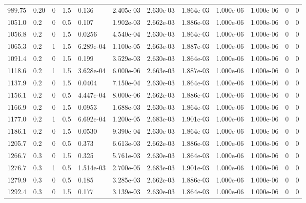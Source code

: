 \documentclass[preview]{standalone}
\begin{document}
{{{\begin{tabular}{L{1.2cm}C{1.2cm} C{0.3cm}C{0.5cm} C{1.4cm}C{1.4cm} C{1.4cm}C{1.4cm} C{1.6cm}C{1.6cm} C{1.6cm}C{1.6cm}}
  989.75  &  0.20  & 0     & 1.5 &  0.136  & 2.405e-03  &  2.630e-03&   1.864e-03& 1.000e-06 & 1.000e-06   &  0 & 0  \\ 
  1051.0  &   0.2  & 0     & 0.5 &  0.107  & 1.902e-03  &  2.662e-03&   1.886e-03& 1.000e-06 & 1.000e-06   &  0 & 0  \\ 
  1056.8  &   0.2  & 0     & 1.5 &  0.0256  & 4.540e-04  &  2.630e-03&   1.864e-03& 1.000e-06 & 1.000e-06   &  0 & 0  \\ 
  1065.3  &   0.2  & 1     & 1.5 &  6.289e-04  & 1.100e-05  &  2.663e-03&   1.887e-03& 1.000e-06 & 1.000e-06   &  0 & 0  \\ 
  1091.4  &   0.2  & 0     & 1.5 &  0.199  & 3.529e-03  &  2.630e-03&   1.864e-03& 1.000e-06 & 1.000e-06   &  0 & 0  \\ 
  1118.6  &   0.2  & 1     & 1.5 &  3.628e-04  & 6.000e-06  &  2.663e-03&   1.887e-03& 1.000e-06 & 1.000e-06   &  0 & 0  \\ 
  1137.9  &   0.2  & 0     & 1.5 &  0.0404  & 7.150e-04  &  2.630e-03&   1.864e-03& 1.000e-06 & 1.000e-06   &  0 & 0  \\ 
  1156.1  &   0.2  & 0     & 0.5 &  4.447e-04  & 8.000e-06  &  2.662e-03&   1.886e-03& 1.000e-06 & 1.000e-06   &  0 & 0  \\ 
  1166.9  &   0.2  & 0     & 1.5 &  0.0953  & 1.688e-03  &  2.630e-03&   1.864e-03& 1.000e-06 & 1.000e-06   &  0 & 0  \\ 
  1177.0  &   0.2  & 1     & 0.5 &  6.692e-04  & 1.200e-05  &  2.683e-03&   1.901e-03& 1.000e-06 & 1.000e-06   &  0 & 0  \\ 
  1186.1  &   0.2  & 0     & 1.5 &  0.0530  & 9.390e-04  &  2.630e-03&   1.864e-03& 1.000e-06 & 1.000e-06   &  0 & 0  \\ 
  1205.7  &   0.2  & 0     & 0.5 &  0.373  & 6.613e-03  &  2.662e-03&   1.886e-03& 1.000e-06 & 1.000e-06   &  0 & 0  \\ 
  1266.7  &   0.3  & 0     & 1.5 &  0.325  & 5.761e-03  &  2.630e-03&   1.864e-03& 1.000e-06 & 1.000e-06   &  0 & 0  \\ 
  1276.7  &   0.3  & 1     & 0.5 &  1.514e-03  & 2.700e-05  &  2.683e-03&   1.901e-03& 1.000e-06 & 1.000e-06   &  0 & 0  \\ 
  1279.9  &   0.3  & 0     & 0.5 &  0.185  & 3.285e-03  &  2.662e-03&   1.886e-03& 1.000e-06 & 1.000e-06   &  0 & 0  \\ 
  1292.4  &   0.3  & 0     & 1.5 &  0.177  & 3.139e-03  &  2.630e-03&   1.864e-03& 1.000e-06 & 1.000e-06   &  0 & 0  \\ 

\end{tabular}}}}
\end{document}
